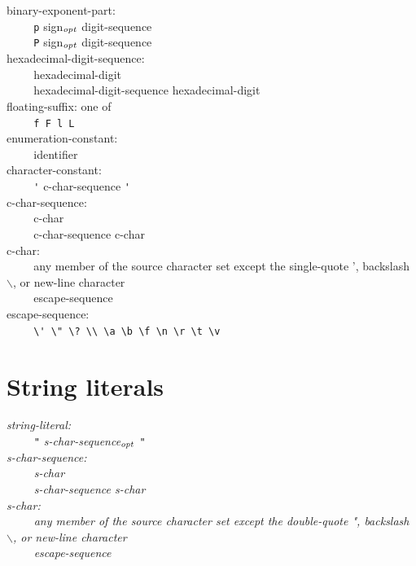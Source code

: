 \documentclass[12pt]{report}
\def\|{\verb|}
\newcommand\opt{$_{{\it opt}}$ }
\begin{document}
\noindent
binary-exponent-part:\\
\|    | \verb+p+ sign\opt digit-sequence\\
\|    | \verb+P+ sign\opt digit-sequence\\

\noindent
hexadecimal-digit-sequence:\\
\|    | hexadecimal-digit\\
\|    | hexadecimal-digit-sequence hexadecimal-digit\\

\noindent
floating-suffix: {\rm one of}\\
\|    | \verb+f F l L+\\

\noindent
enumeration-constant:\\
\|    | identifier\\

\noindent
character-constant:\\
\|    | \verb+'+ c-char-sequence \verb+'+\\

\noindent
c-char-sequence:\\
\|    | c-char\\
\|    | c-char-sequence c-char\\

\noindent
c-char:\\
\|    | {\rm any member of the source character set except the single-quote ', backslash $\backslash$, or new-line character}\\
\|    | escape-sequence\\

\noindent
escape-sequence:\\
\|    | \verb+\' \" \? \\ \a \b \f \n \r \t \v+\\

\rm
\section{String literals}
\it
\noindent
string-literal:\\
\|    | \verb+"+ s-char-sequence\opt \verb+"+\\

\noindent
s-char-sequence:\\
\|    | s-char\\
\|    | s-char-sequence s-char\\

\noindent
s-char:\\
\|    | {\rm any member of the source character set except the double-quote ", backslash $\backslash$, or new-line character}\\
\|    | escape-sequence\\
\end{document}
